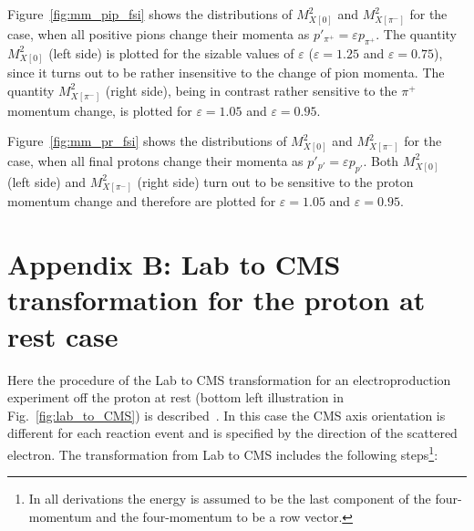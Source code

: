 Figure~\ref{fig:mm_pip_fsi} shows the distributions of $M_{X[0]}^{2}$ and $M_{X[\pi^{-}]}^{2}$ for the case, when all positive pions change their momenta as $p'_{\pi^{+}} = \varepsilon p_{\pi^{+}}$. The quantity $M_{X[0]}^{2}$ (left side) is plotted for the sizable values of $\varepsilon$ ($\varepsilon = 1.25$ and $\varepsilon = 0.75$), since it turns out to be rather insensitive to the change of pion momenta. The quantity 
$M_{X[\pi^{-}]}^{2}$ (right side), being in contrast rather sensitive to the $\pi^{+}$ momentum change, is plotted for $\varepsilon = 1.05$ and $\varepsilon = 0.95$.

Figure~\ref{fig:mm_pr_fsi} shows the distributions of $M_{X[0]}^{2}$ and $M_{X[\pi^{-}]}^{2}$ for the case, when all final protons change their momenta as $p'_{p'} = \varepsilon p_{p'}$. Both $M_{X[0]}^{2}$ (left side) and $M_{X[\pi^{-}]}^{2}$ (right side) turn out to be sensitive to the proton momentum change and therefore are plotted for $\varepsilon = 1.05$ and $\varepsilon = 0.95$.

\renewcommand{\thesection}{B}
    \makeatletter
   \renewcommand{\theequation}{\thesection.\@arabic\c@equation}
    \makeatother
\section*{Appendix B: Lab to CMS transformation for the proton at rest case}
\label{app_lab_cms_trans}

Here the procedure of the Lab to CMS transformation for an electroproduction experiment off the proton at rest (bottom left illustration in Fig.~\ref{fig:lab_to_CMS}) is described~\cite{Fed_an_note:2017}. In this case the CMS axis orientation is different for each reaction event and is specified by the direction of the scattered electron. The transformation from Lab to CMS includes the following steps\footnote[1]{In all derivations the energy is assumed to be the last component of the four-momentum and the four-momentum to be a row vector.}:\vspace{-1em}

